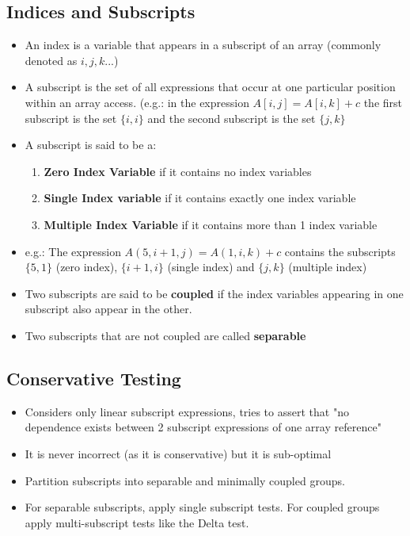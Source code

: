 \documentclass{article}
\begin{document}
\subsection{Indices and Subscripts}
\begin{itemize}
    \item An index is a variable that appears in a subscript of an array (commonly denoted as $i, j, k ...$)
    
    \item A subscript is the set of all expressions that occur at one particular position within an array access. (e.g.: in the expression $A[i, j] = A[i, k] + c$ the first subscript is the set $\{i, i\}$ and the second subscript is the set $\{j, k\}$
    
    \item A subscript is said to be a:
    \begin{enumerate}
        \item \textbf{Zero Index Variable} if it contains no index variables
        
        \item \textbf{Single Index variable} if it contains exactly one index variable
        
        \item \textbf{Multiple Index Variable} if it contains more than 1 index variable
    \end{enumerate}
    
    \item e.g.: The expression $A(5, i+1, j) = A(1, i, k) + c$ contains the subscripts $\{5, 1\}$ (zero index), $\{i+1, i\}$ (single index) and $\{j, k\}$ (multiple index)
    
    \item Two subscripts are said to be \textbf{coupled} if the index variables appearing in one subscript also appear in the other. 
    
    \item Two subscripts that are not coupled are called \textbf{separable}
\end{itemize}

\subsection{Conservative Testing}
\begin{itemize}
    \item Considers only linear subscript expressions, tries to assert that "no dependence exists between 2 subscript expressions of one array reference"
    
    \item It is never incorrect (as it is conservative) but it is sub-optimal
    
    \item Partition subscripts into separable and minimally coupled groups. 
    
    \item For separable subscripts, apply single subscript tests. For coupled groups apply multi-subscript tests like the Delta test.
\end{itemize}
\end{document}
